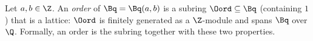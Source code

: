 Let $a,b\in\Z$. An \emph{order} of $\Bq=\Bq(a,b)$ is a subring $\Oord\subseteq\Bq$ (containing $1$) that is a lattice: $\Oord$ is finitely
generated as a $\Z$-module and spans $\Bq$ over $\Q$. Formally, an order is the subring together with these two properties.
